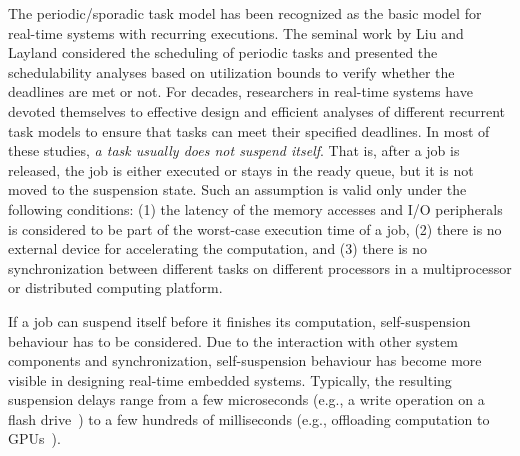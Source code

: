 
The periodic/sporadic task model has been recognized as the basic
model for real-time systems with recurring executions.  
The seminal work by Liu and Layland \cite{Liu_1973} considered the
scheduling of periodic tasks and presented the schedulability analyses
based on utilization bounds to verify whether the deadlines are met or
not.  For decades, researchers in real-time systems have
devoted themselves to effective design and efficient analyses of
different recurrent task models to ensure that tasks can meet their
specified deadlines. In most of these studies, \emph{a task usually does not
 suspend itself}. That is, after a job is released, the job
is either executed or stays in the ready queue, but it is not moved to
the suspension state.  Such an assumption is valid only under the
following conditions: (1) the latency of the memory accesses and I/O
peripherals is considered to be part of the worst-case execution time
of a job, (2) there is no external device for accelerating the
computation, and (3) there is no synchronization between different
tasks on different processors in a multiprocessor or distributed
computing platform.


If a job can suspend itself before it finishes its computation,
self-suspension behaviour has to be considered. Due to the interaction
with other system components and synchronization, self-suspension
behaviour has become more visible in designing real-time embedded
systems.  Typically, the resulting suspension delays range from a few
microseconds (e.g., a write operation on a flash
drive~\cite{Kang:rtss07}) to a few hundreds of milliseconds (e.g.,
offloading computation to GPUs~\cite{Kato_2011,Liu_2014}).


